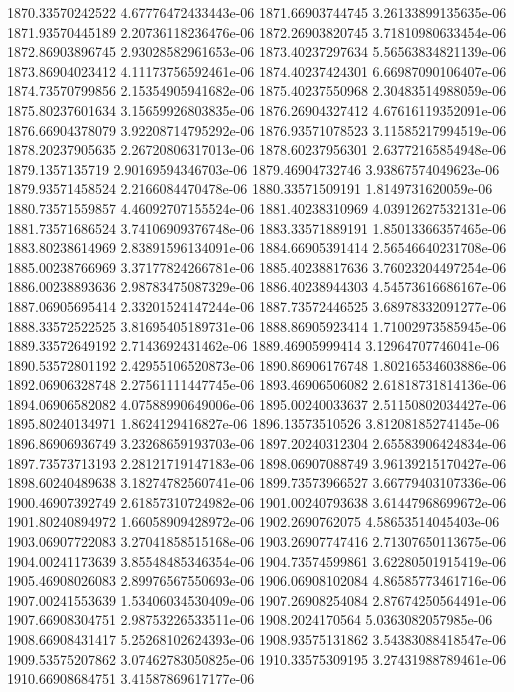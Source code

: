 {1870.33570242522 4.67776472433443e-06
1871.66903744745 3.26133899135635e-06
1871.93570445189 2.20736118236476e-06
1872.26903820745 3.71810980633454e-06
1872.86903896745 2.93028582961653e-06
1873.40237297634 5.56563834821139e-06
1873.86904023412 4.11173756592461e-06
1874.40237424301 6.66987090106407e-06
1874.73570799856 2.15354905941682e-06
1875.40237550968 2.30483514988059e-06
1875.80237601634 3.15659926803835e-06
1876.26904327412 4.67616119352091e-06
1876.66904378079 3.92208714795292e-06
1876.93571078523 3.11585217994519e-06
1878.20237905635 2.26720806317013e-06
1878.60237956301 2.63772165854948e-06
1879.1357135719 2.90169594346703e-06
1879.46904732746 3.93867574049623e-06
1879.93571458524 2.2166084470478e-06
1880.33571509191 1.8149731620059e-06
1880.73571559857 4.46092707155524e-06
1881.40238310969 4.03912627532131e-06
1881.73571686524 3.74106909376748e-06
1883.33571889191 1.85013366357465e-06
1883.80238614969 2.83891596134091e-06
1884.66905391414 2.56546640231708e-06
1885.00238766969 3.37177824266781e-06
1885.40238817636 3.76023204497254e-06
1886.00238893636 2.98783475087329e-06
1886.40238944303 4.54573616686167e-06
1887.06905695414 2.33201524147244e-06
1887.73572446525 3.68978332091277e-06
1888.33572522525 3.81695405189731e-06
1888.86905923414 1.71002973585945e-06
1889.33572649192 2.7143692431462e-06
1889.46905999414 3.12964707746041e-06
1890.53572801192 2.42955106520873e-06
1890.86906176748 1.80216534603886e-06
1892.06906328748 2.27561111447745e-06
1893.46906506082 2.61818731814136e-06
1894.06906582082 4.07588990649006e-06
1895.00240033637 2.51150802034427e-06
1895.80240134971 1.8624129416827e-06
1896.13573510526 3.81208185274145e-06
1896.86906936749 3.23268659193703e-06
1897.20240312304 2.65583906424834e-06
1897.73573713193 2.28121719147183e-06
1898.06907088749 3.96139215170427e-06
1898.60240489638 3.18274782560741e-06
1899.73573966527 3.66779403107336e-06
1900.46907392749 2.61857310724982e-06
1901.00240793638 3.61447968699672e-06
1901.80240894972 1.66058909428972e-06
1902.2690762075 4.58653514045403e-06
1903.06907722083 3.27041858515168e-06
1903.26907747416 2.71307650113675e-06
1904.00241173639 3.85548485346354e-06
1904.73574599861 3.62280501915419e-06
1905.46908026083 2.89976567550693e-06
1906.06908102084 4.86585773461716e-06
1907.00241553639 1.53406034530409e-06
1907.26908254084 2.87674250564491e-06
1907.66908304751 2.98753226533511e-06
1908.2024170564 5.0363082057985e-06
1908.66908431417 5.25268102624393e-06
1908.93575131862 3.54383088418547e-06
1909.53575207862 3.07462783050825e-06
1910.33575309195 3.27431988789461e-06
1910.66908684751 3.41587869617177e-06
}
